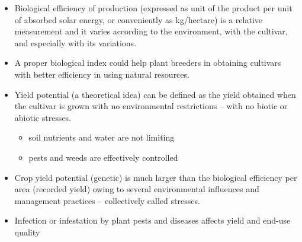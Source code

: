 \documentclass[11pt,dvipsnames,ignorenonframetext,aspectratio=169]{beamer}
\providecommand{\tightlist}{%
  \setlength{\itemsep}{0pt}\setlength{\parskip}{0pt}}
\begin{document}
\begin{frame}{}
\protect\hypertarget{section-2}{}
\footnotesize

\begin{itemize}
\tightlist
\item
  Biological efficiency of production (expressed as unit of the product
  per unit of absorbed solar energy, or conveniently as kg/hectare) is a
  relative measurement and it varies according to the environment, with
  the cultivar, and especially with its variations.
\item
  A proper biological index could help plant breeders in obtaining
  cultivars with better efficiency in using natural resources.
\item
  Yield potential (a theoretical idea) can be defined as the yield
  obtained when the cultivar is grown with no environmental restrictions
  -- with no biotic or abiotic stresses.

  \begin{itemize}
  \footnotesize
  \item soil nutrients and water are not limiting
  \item pests and weeds are effectively controlled
  \end{itemize}
\item
  Crop yield potential (genetic) is much larger than the biological
  efficiency per area (recorded yield) owing to several environmental
  influences and management practices -- collectively called
  \alert{stresses}.
\item
  Infection or infestation by plant pests and diseases affects
  \alert{yield} and \alert{end-use quality}
\end{itemize}
\end{frame}
\end{document}
